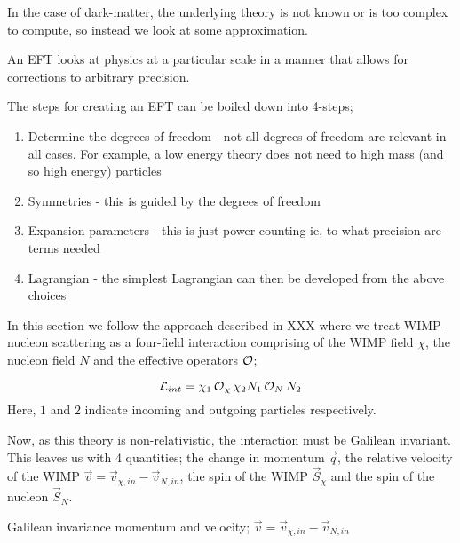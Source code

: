 \par
In the case of dark-matter, the underlying theory is not known or is too complex to compute, so instead we look at some approximation.

\par
An EFT looks at physics at a particular scale in a manner that allows for corrections to arbitrary precision.


\par
The steps for creating an EFT can be boiled down into 4-steps;
\begin{enumerate}
    \item Determine the degrees of freedom - not all degrees of freedom are relevant in all cases. For example, a low energy theory does not need to high mass (and so high energy) particles
    \item Symmetries - this is guided by the degrees of freedom
    \item Expansion parameters - this is just power counting ie, to what precision are terms needed
    \item Lagrangian - the simplest Lagrangian can then be developed from the above choices
\end{enumerate}


\par
In this section we follow the approach described in XXX where we treat WIMP-nucleon scattering as a four-field interaction comprising of the WIMP field $\chi$, the nucleon field $N$ and the effective operators $\operatorname{\mathcal{O}}$;

\begin{equation}
    \operatorname{\mathcal{L}}_{int} = \chi_{1} \operatorname{\mathcal{O}}_{\chi} \chi_{2} N_{1} \operatorname{\mathcal{O}}_{N} N_{2}
\end{equation}
Here, $1$ and $2$ indicate incoming and outgoing particles respectively.

\par
Now, as this theory is non-relativistic, the interaction must be Galilean invariant.
This leaves us with 4 quantities; the change in momentum $\vec{q}$, the relative velocity of the WIMP $\vec{v}=\vec{v}_{\chi,in} - \vec{v}_{N,in}$, the spin of the WIMP $\vec{S}_{\chi}$ and the spin of the nucleon $\vec{S}_{N}$.




\par
Galilean invariance momentum and velocity;
$\Vec{v} = \Vec{v}_{\chi,in} - \Vec{v}_{N,in}$


